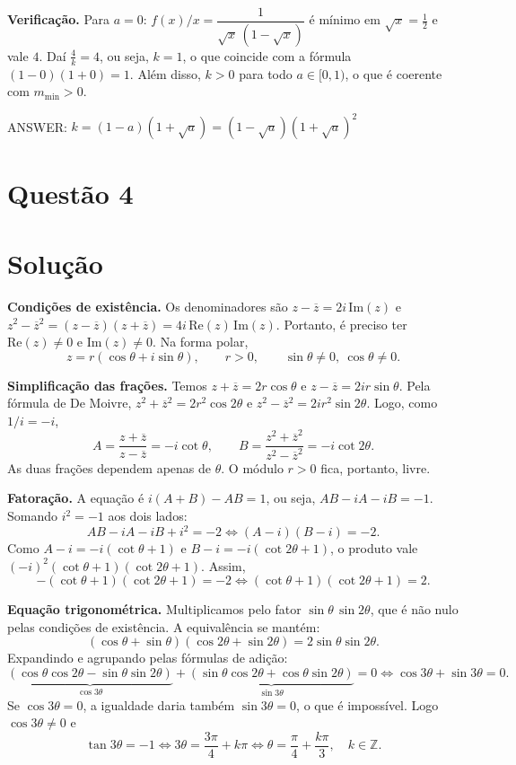 \documentclass{article}%
\begin{document}
\textbf{Verificação.} Para $a=0$: $f(x)/x=\dfrac{1}{\sqrt x\,(1-\sqrt x)}$ é mínimo em $\sqrt x=\tfrac12$ e vale $4$. Daí $\frac4k=4$, ou seja, $k=1$, o que coincide com a fórmula $(1-0)(1+0)=1$. Além disso, $k>0$ para todo $a\in[0,1)$, o que é coerente com $m_{\min}>0$.

\medskip
ANSWER: $k=(1-a)(1+\sqrt{a})=(1-\sqrt a)(1+\sqrt a)^2$%
\newpage%
\section*{Questão 4}

\section*{Solução}

\textbf{Condições de existência.} Os denominadores são $z-\overline{z}=2i\,\mathrm{Im}(z)$ e $z^2-\overline{z}^2=(z-\overline{z})(z+\overline{z})=4i\,\mathrm{Re}(z)\,\mathrm{Im}(z)$. Portanto, é preciso ter $\mathrm{Re}(z)\neq 0$ e $\mathrm{Im}(z)\neq 0$. Na forma polar,
\[
z=r(\cos\theta+i\sin\theta),\qquad r>0,\qquad \sin\theta\neq 0,\ \cos\theta\neq 0 .
\]

\textbf{Simplificação das frações.} Temos $z+\overline{z}=2r\cos\theta$ e $z-\overline{z}=2ir\sin\theta$. Pela fórmula de De Moivre, $z^2+\overline{z}^2=2r^2\cos 2\theta$ e $z^2-\overline{z}^2=2ir^2\sin 2\theta$. Logo, como $1/i=-i$,
\[
A=\frac{z+\overline{z}}{z-\overline{z}}=-i\cot\theta,\qquad
B=\frac{z^2+\overline{z}^2}{z^2-\overline{z}^2}=-i\cot 2\theta .
\]
As duas frações dependem apenas de $\theta$. O módulo $r>0$ fica, portanto, livre.

\textbf{Fatoração.} A equação é $i(A+B)-AB=1$, ou seja, $AB-iA-iB=-1$. Somando $i^2=-1$ aos dois lados:
\[
AB-iA-iB+i^2=-2\iff (A-i)(B-i)=-2 .
\]
Como $A-i=-i(\cot\theta+1)$ e $B-i=-i(\cot2\theta+1)$, o produto vale $(-i)^2(\cot\theta+1)(\cot2\theta+1)$. Assim,
\[
-(\cot\theta+1)(\cot 2\theta+1)=-2\iff(\cot\theta+1)(\cot 2\theta+1)=2 .
\]

\textbf{Equação trigonométrica.} Multiplicamos pelo fator $\sin\theta\,\sin2\theta$, que é não nulo pelas condições de existência. A equivalência se mantém:
\[
(\cos\theta+\sin\theta)(\cos2\theta+\sin2\theta)=2\sin\theta\sin2\theta .
\]
Expandindo e agrupando pelas fórmulas de adição:
\[
\underbrace{(\cos\theta\cos2\theta-\sin\theta\sin2\theta)}_{\cos3\theta}+\underbrace{(\sin\theta\cos2\theta+\cos\theta\sin2\theta)}_{\sin3\theta}=0
\iff \cos3\theta+\sin3\theta=0 .
\]
Se $\cos3\theta=0$, a igualdade daria também $\sin3\theta=0$, o que é impossível. Logo $\cos 3\theta\neq 0$ e
\[
\tan3\theta=-1\iff 3\theta=\frac{3\pi}{4}+k\pi\iff \theta=\frac{\pi}{4}+\frac{k\pi}{3},\quad k\in\mathbb{Z}.
\]
\end{document}
